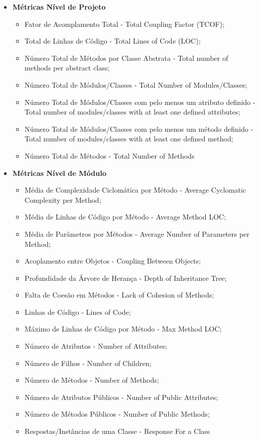 \begin{itemize}
  \item \textbf{Métricas Nível de Projeto}
		\begin{itemize}
			\item Fator de Acomplamento Total - Total Coupling Factor (TCOF);
			\item Total de Linhas de Código - Total Lines of Code (LOC);
			\item Número Total de Métodos por Classe Abstrata - Total number of methods per abstract class;
			\item Número Total de Módulos/Classes - Total Number of Modules/Classes;
			\item Número Total de Módulos/Classes com pelo menos um atributo definido - Total number of modules/classes with at least one defined attributes;
			\item Número Total de Módulos/Classes com pelo menos um método definido - Total number of modules/classes with at least one defined method;
			\item Número Total de Métodos - Total Number of Methods
		\end{itemize}
  \item \textbf{Métricas Nível de Módulo}
		\begin{itemize}
			\item Média de Complexidade Ciclomática por Método - Average Cyclomatic Complexity per Method;
			\item Média de Linhas de Código por Método - Average Method LOC;
			\item Média de Parâmetros por Métodos - Average Number of Parameters per Method;
			\item Acoplamento entre Objetos - Coupling Between Objects;
			\item Profundidade da Árvore de Herança - Depth of Inheritance Tree;
			\item Falta de Coesão em Métodos - Lack of Cohesion of Methods;
			\item Linhas de Código - Lines of Code;
			\item Máximo de Linhas de Código por Método - Max Method LOC;
			\item Número de Atributos - Number of Attributes;
			\item Número de Filhos - Number of Children;
			\item Número de Métodos - Number of Methods;
			\item Número de Atributos Públicos - Number of Public Attributes;
			\item Número de Métodos Públicos - Number of Public Methods;
			\item Respostas/Instâncias de uma Classe - Response For a Class
		\end{itemize}
\end{itemize}

